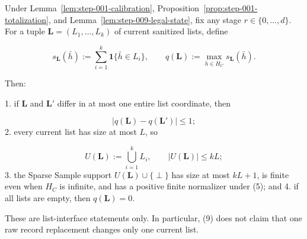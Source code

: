 \begin{lemma}\label{lem:step-010-score-support}
Under Lemma~\ref{lem:step-001-calibration}, Proposition~\ref{prop:step-001-totalization}, and Lemma~\ref{lem:step-009-legal-state}, fix any stage
\(r\in\{0,\ldots,d\}\). For a tuple
\(\mathbf L=(L_1,\ldots,L_k)\) of current sanitized lists, define

\[
 s_{\mathbf L}(\bar h)
 :=\sum_{i=1}^k\mathbf1\{\bar h\in L_i\},
 \qquad
 q(\mathbf L):=\max_{\bar h\in H_C}s_{\mathbf L}(\bar h).
 \tag{8}
\]

Then:

1. if \(\mathbf L\) and \(\mathbf L'\) differ in at most one entire list
   coordinate, then

   \[
     |q(\mathbf L)-q(\mathbf L')|\leq1;
     \tag{9}
   \]
2. every current list has size at most \(L\), so

   \[
     U(\mathbf L):=\bigcup_{i=1}^kL_i,
     \qquad |U(\mathbf L)|\leq kL;
     \tag{10}
   \]
3. the Sparse Sample support
   \(U(\mathbf L)\cup\{\perp\}\) has size at most \(kL+1\), is finite even
   when \(H_C\) is infinite, and has a positive finite normalizer under
   (5); and
4. if all lists are empty, then \(q(\mathbf L)=0\).

These are list-interface statements only. In particular, (9) does not
claim that one raw record replacement changes only one current list.


\end{lemma}

